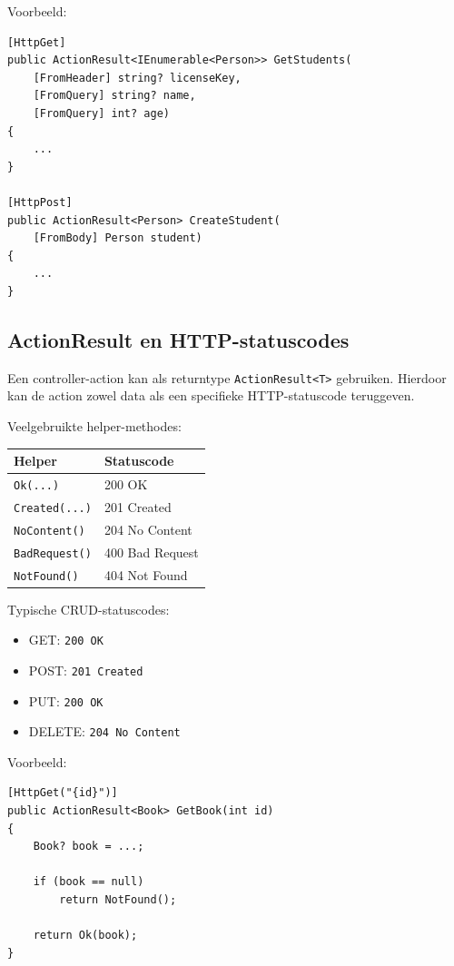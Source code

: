 Voorbeeld:

\begin{verbatim}
[HttpGet]
public ActionResult<IEnumerable<Person>> GetStudents(
    [FromHeader] string? licenseKey,
    [FromQuery] string? name,
    [FromQuery] int? age)
{
    ...
}

[HttpPost]
public ActionResult<Person> CreateStudent(
    [FromBody] Person student)
{
    ...
}
\end{verbatim}

\subsection{ActionResult en HTTP-statuscodes}

Een controller-action kan als returntype \texttt{ActionResult<T>} gebruiken.
Hierdoor kan de action zowel data als een specifieke HTTP-statuscode teruggeven.

Veelgebruikte helper-methodes:

\begin{center}
\begin{tabular}{ll}
\textbf{Helper} & \textbf{Statuscode} \\
\hline
\texttt{Ok(...)} & 200 OK \\
\texttt{Created(...)} & 201 Created \\
\texttt{NoContent()} & 204 No Content \\
\texttt{BadRequest()} & 400 Bad Request \\
\texttt{NotFound()} & 404 Not Found \\
\end{tabular}
\end{center}

Typische CRUD-statuscodes:

\begin{itemize}
    \item GET: \texttt{200 OK}
    \item POST: \texttt{201 Created}
    \item PUT: \texttt{200 OK}
    \item DELETE: \texttt{204 No Content}
\end{itemize}

Voorbeeld:

\begin{verbatim}
[HttpGet("{id}")]
public ActionResult<Book> GetBook(int id)
{
    Book? book = ...;

    if (book == null)
        return NotFound();

    return Ok(book);
}
\end{verbatim}

